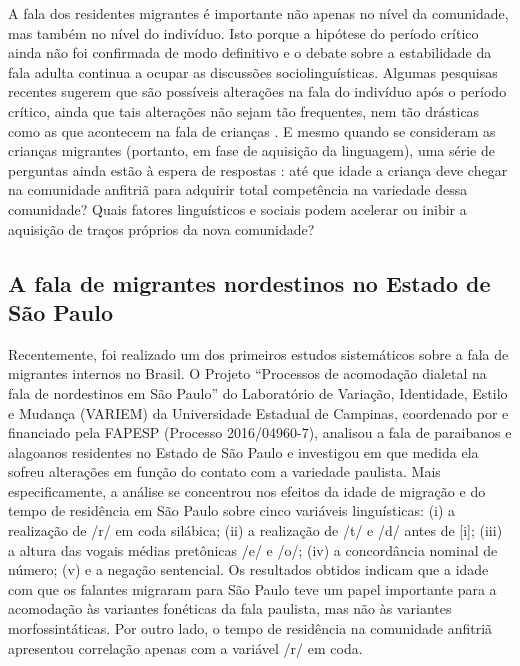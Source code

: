 \documentclass[
		a4paper,	%
		12pt,		%
		]{article}	%
\begin{document}
	A fala dos residentes migrantes é importante não apenas no nível da
	comunidade, mas também no nível do indivíduo. Isto porque a hipótese do
	período crítico \citep{Lenneberg1967} ainda não foi confirmada de modo
	definitivo e o debate sobre a estabilidade da fala adulta continua a ocupar
	as discussões sociolinguísticas. Algumas pesquisas recentes sugerem que são
	possíveis alterações na fala do indivíduo após o período crítico, ainda que
	tais alterações não sejam tão frequentes, nem tão drásticas como as que
	acontecem na fala de crianças \citep{Cukor-Avila.Bailey2013}. E mesmo quando
	se consideram as crianças migrantes (portanto, em fase de aquisição da
	linguagem), uma série de perguntas ainda estão à espera de respostas
	\citep{Oushiro2016, Nycz2015, Chambers1992, Trudgill1986}: até que idade a
	criança deve chegar na comunidade anfitriã para adquirir total competência
	na variedade dessa comunidade? Quais fatores linguísticos e sociais podem
	acelerar ou inibir a aquisição de traços próprios da nova comunidade?

	\subsection{A fala de migrantes nordestinos no Estado de São Paulo}
	\label{estudos-sp}

	Recentemente, foi realizado um dos primeiros estudos sistemáticos sobre a fala
	de migrantes internos no Brasil. O Projeto \enquote{Processos de acomodação
	dialetal na fala de nordestinos em São Paulo} do Laboratório de Variação,
	Identidade, Estilo e Mudança (VARIEM) da Universidade Estadual de Campinas,
	coordenado por \citet{Oushiro2018} e financiado pela FAPESP (Processo
	2016/04960-7), analisou a fala de paraibanos e alagoanos residentes no Estado de
	São Paulo e investigou em que medida ela sofreu alterações em função do contato
	com a variedade paulista.  Mais especificamente, a análise se concentrou nos
	efeitos da idade de migração e do tempo de residência em São Paulo sobre cinco
	variáveis linguísticas: (i) a realização de /r/ em coda silábica; (ii) a
	realização de /t/ e /d/ antes de [i]; (iii) a altura das vogais médias
	pretônicas /e/ e /o/; (iv) a concordância nominal de número; (v) e a negação
	sentencial. Os resultados obtidos indicam que a idade com que os falantes
	migraram para São Paulo teve um papel importante para a acomodação às variantes
	fonéticas da fala paulista, mas não às variantes morfossintáticas. Por outro
	lado, o tempo de residência na comunidade anfitriã apresentou correlação apenas
	com a variável /r/ em coda.
\end{document}
